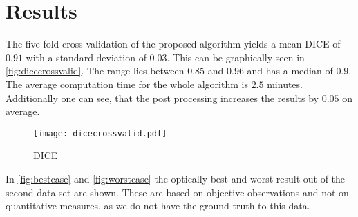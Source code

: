 \section{Results}
The five fold cross validation of the proposed algorithm yields a mean DICE of $0.91$ with a standard deviation of $0.03$. This can be graphically seen in \autoref{fig:dicecrossvalid}. The range lies between $0.85$ and $0.96$ and has a median of $0.9$. The average computation time for the whole algorithm is $2.5$ minutes. Additionally one can see, that the post processing increases the results by $0.05$ on average.
\begin{figure}[h]
\centering
\texttt{[image: dicecrossvalid.pdf]}
\caption{DICE}
\label{fig:dicecrossvalid}
\end{figure}

In \autoref{fig:bestcase} and \autoref{fig:worstcase} the optically best and worst result out of the second data set are shown. These are based on objective observations and not on quantitative measures, as we do not have the ground truth to this data.
\begin{figure*}[!t]
	\centering
	\hfil
\end{figure*}